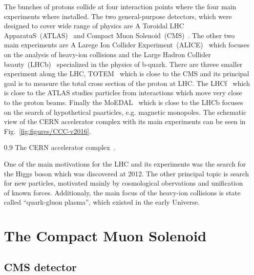 The bunches of protons collide at four interaction points where the four main experiments where installed. The two general-purpose detectors, which were designed to cover wide range of physics are A Toroidal  LHC ApparatuS~(ATLAS)~\cite{Aad:2008zzm} and Compact Muon Solenoid~(CMS)~\cite{Chatrchyan:2008aa}. The other two main experiments are A Larege Ion Collider Experiment~(ALICE)~\cite{Aamodt:2008zz} which focuses on the analysis of heavy-ion collisions and the Large Hadron Collider beauty~(LHCb)~\cite{Alves:2008zz} specialized in the physics of b-quark. There are threee smaller experiment along the LHC, TOTEM~\cite{Anelli:2008zza} which is close to the CMS and its principal goal is to measure the total cross section of the proton at LHC.  The LHCf~\cite{Adriani:2008zz} which is close to the ATLAS studies particles from interactions which move very close to the proton beams. Finally the MoEDAL~\cite{Acharya:2014nyr} which is close to the LHCb focuses on the search of hypothetical paarticles, e.g. magnetic monopoles. The schematic view of the CERN accelerator complex with its main experiments can be seen in Fig.~\ref{fig:figures/CCC-v2016}.

                 {0.9}       %
                 { The CERN accelerator complex~\cite{Mobs:2225847}. }

One of the main motivations for the LHC and its experiments was the search for the Higgs boson which was discovered at 2012. The other principal topic is search for new particles, motivated mainly by cosmological obervations and unification of known forces. Additionaly, the main focus of the  heavy-ion collisions is state called ``quark-gluon plasma'', which existed in the early Universe.

\newpage

\section{The Compact Muon Solenoid}

\subsection{CMS detector}

